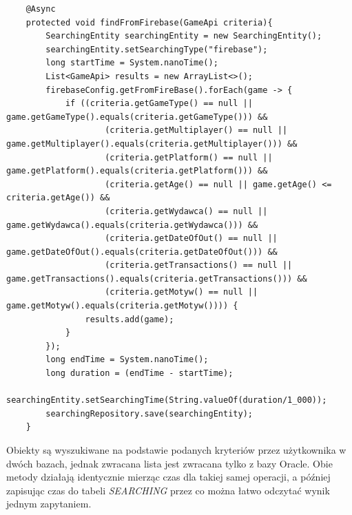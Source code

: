 \begin{lstlisting}
    @Async
    protected void findFromFirebase(GameApi criteria){
        SearchingEntity searchingEntity = new SearchingEntity();
        searchingEntity.setSearchingType("firebase");
        long startTime = System.nanoTime();
        List<GameApi> results = new ArrayList<>();
        firebaseConfig.getFromFireBase().forEach(game -> {
            if ((criteria.getGameType() == null || game.getGameType().equals(criteria.getGameType())) &&
                    (criteria.getMultiplayer() == null || game.getMultiplayer().equals(criteria.getMultiplayer())) &&
                    (criteria.getPlatform() == null || game.getPlatform().equals(criteria.getPlatform())) &&
                    (criteria.getAge() == null || game.getAge() <= criteria.getAge()) &&
                    (criteria.getWydawca() == null || game.getWydawca().equals(criteria.getWydawca())) &&
                    (criteria.getDateOfOut() == null || game.getDateOfOut().equals(criteria.getDateOfOut())) &&
                    (criteria.getTransactions() == null || game.getTransactions().equals(criteria.getTransactions())) &&
                    (criteria.getMotyw() == null || game.getMotyw().equals(criteria.getMotyw()))) {
                results.add(game);
            }
        });
        long endTime = System.nanoTime();
        long duration = (endTime - startTime);
        searchingEntity.setSearchingTime(String.valueOf(duration/1_000));
        searchingRepository.save(searchingEntity);
    }
\end{lstlisting}

Obiekty są wyszukiwane na podstawie podanych kryteriów przez użytkownika w dwóch bazach, jednak zwracana lista jest zwracana tylko z bazy Oracle. Obie metody działają identycznie mierząc czas dla takiej samej operacji, a później zapisując czas do tabeli \textit{SEARCHING} przez co można łatwo odczytać wynik jednym zapytaniem.

